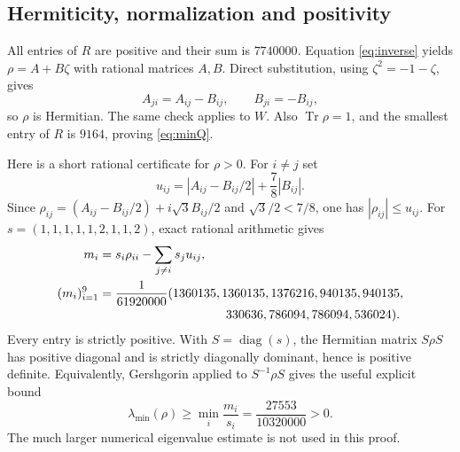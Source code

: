 \documentclass[11pt,a4paper]{article}
\theoremstyle{definition}
\theoremstyle{plain}
\DeclareMathOperator{\Tr}{Tr}
\begin{document}
\subsection{Hermiticity, normalization and positivity}
All entries of $R$ are positive and their sum is $7740000$.
Equation \eqref{eq:inverse} yields $\rho=A+B\zeta$ with rational matrices
$A,B$. Direct substitution, using $\zeta^2=-1-\zeta$, gives
\[
 A_{ji}=A_{ij}-B_{ij},\qquad B_{ji}=-B_{ij},
\]
so $\rho$ is Hermitian. The same check applies to $W$. Also $\Tr\rho=1$,
and the smallest entry of $R$ is $9164$, proving \eqref{eq:minQ}.

Here is a short rational certificate for $\rho>0$. For $i\ne j$ set
\[
 u_{ij}=|A_{ij}-B_{ij}/2|+\frac78|B_{ij}|.
\]
Since $\rho_{ij}=(A_{ij}-B_{ij}/2)+i\sqrt3 B_{ij}/2$ and
$\sqrt3/2<7/8$, one has $|\rho_{ij}|\leq u_{ij}$.
For $s=(1,1,1,1,1,2,1,1,2)$, exact rational arithmetic gives
\begin{equation}\label{eq:margins}
\begin{split}
 m_i&=s_i\rho_{ii}-\sum_{j\ne i}s_j u_{ij},\\
 (m_i)_{i=1}^9&=\frac1{61920000}
 (1360135,1360135,1376216,940135,940135,\\[-2pt]
 &\hspace{36mm}330636,786094,786094,536024).
\end{split}
\end{equation}
Every entry is strictly positive. With $S=\operatorname{diag}(s)$, the
Hermitian matrix $S\rho S$ has positive diagonal and is strictly diagonally
dominant, hence is positive definite. Equivalently, Gershgorin applied to
$S^{-1}\rho S$ gives the useful explicit bound
\begin{equation}\label{eq:eiglower}
 \lambda_{\min}(\rho)\geq\min_i\frac{m_i}{s_i}
 =\frac{27553}{10320000}>0.
\end{equation}
The much larger numerical eigenvalue estimate is not used in this proof.
\end{document}
